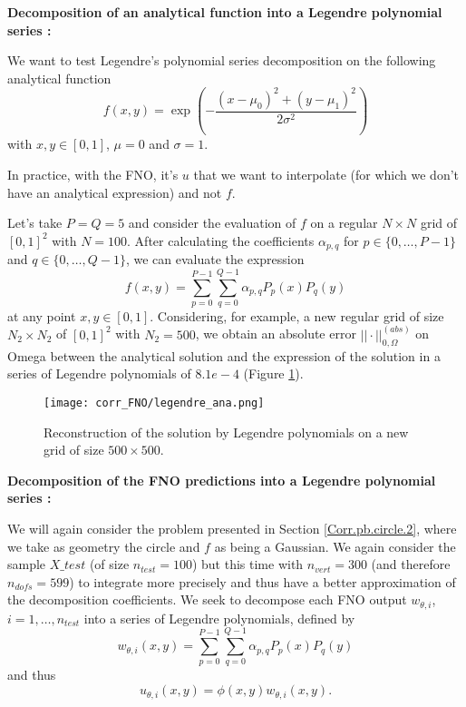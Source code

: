 \textbf{Decomposition of an analytical function into a Legendre polynomial series :}

We want to test Legendre's polynomial series decomposition on the following analytical function
\begin{equation*}
	f(x,y)=\exp\left(-\frac{(x-\mu_0)^2 + (y-\mu_1)^2}{2\sigma^2}\right)
\end{equation*}
with $x,y\in [0,1]$, $\mu=0$ and $\sigma=1$.

\begin{Rem}
	In practice, with the FNO, it's $u$ that we want to interpolate (for which we don't have an analytical expression) and not $f$.
\end{Rem}

Let's take $P=Q=5$ and consider the evaluation of $f$ on a regular $N\times N$ grid of $[0,1]^2$ with $N=100$. After calculating the coefficients $\alpha_{p,q}$ for $p\in \{0,\dots,P-1\}$ and $q\in \{0,\dots,Q-1\}$, we can evaluate the expression
\begin{equation*}
	f(x,y)=\sum_{p=0}^{P-1}\sum_{q=0}^{Q-1}\alpha_{p,q}P_p(x)P_q(y)
\end{equation*}
at any point $x,y\in[0,1]$. Considering, for example, a new regular grid of size $N_2\times N_2$ of $[0,1]^2$ with $N_2=500$, we obtain an absolute error $||\cdot||_{0,\Omega}^{(abs)}$ on Omega between the analytical solution and the expression of the solution in a series of Legendre polynomials of $8.1e-4$ (Figure \ref{legendre_ana}).

\begin{figure}[H]
	\centering
	\texttt{[image: corr\_FNO/legendre\_ana.png]}
	\caption{Reconstruction of the solution by Legendre polynomials on a new grid of size $500\times 500$.}
	\label{legendre_ana}
\end{figure} 

\textbf{Decomposition of the FNO predictions into a Legendre polynomial series :}

We will again consider the problem presented in Section \ref{Corr.pb.circle.2}, where we take as geometry the circle and $f$ as being a Gaussian. We again consider the sample $X\_test$ (of size $n_{test}=100$) but this time with $n_{vert}=300$ (and therefore $n_{dofs}=599$) to integrate more precisely and thus have a better approximation of the decomposition coefficients. We seek to decompose each FNO output $w_{\theta,i}$, $i=1,\dots,n_{test}$ into a series of Legendre polynomials, defined by
\begin{equation*}
	w_{\theta,i}(x,y)=\sum_{p=0}^{P-1}\sum_{q=0}^{Q-1}\alpha_{p,q}P_p(x)P_q(y)
\end{equation*}
and thus
\begin{equation*}
	u_{\theta,i}(x,y)=\phi(x,y)w_{\theta,i}(x,y).
\end{equation*}

